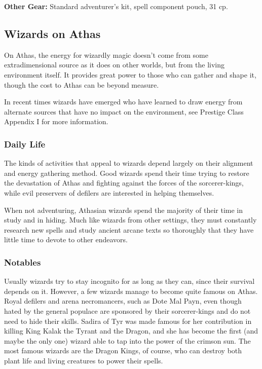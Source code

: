 \textbf{Other Gear:} Standard adventurer's kit, spell component pouch, 31 cp.


\subsection{Wizards on Athas}

On Athas, the energy for wizardly magic doesn't come from some extradimensional source as it does on other worlds, but from the living environment itself. It provides great power to those who can gather and shape it, though the cost to Athas can be beyond measure.

In recent times wizards have emerged who have learned to draw energy from alternate sources that have no impact on the environment, see Prestige Class Appendix I for more information.

\subsubsection{Daily Life}
The kinds of activities that appeal to wizards depend largely on their alignment and energy gathering method. Good wizards spend their time trying to restore the devastation of Athas and fighting against the forces of the sorcerer-kings, while evil preservers of defilers are interested in helping themselves.

When not adventuring, Athasian wizards spend the majority of their time in study and in hiding. Much like wizards from other settings, they must constantly research new spells and study ancient arcane texts so thoroughly that they have little time to devote to other endeavors.

\subsubsection{Notables}
Usually wizards try to stay incognito for as long as they can, since their survival depends on it. However, a few wizards manage to become quite famous on Athas. Royal defilers and arena necromancers, such as Dote Mal Payn, even though hated by the general populace are sponsored by their sorcerer-kings and do not need to hide their skills. Sadira of Tyr was made famous for her contribution in killing King Kalak the Tyrant and the Dragon, and she has become the first (and maybe the only one) wizard able to tap into the power of the crimson sun. The most famous wizards are the Dragon Kings, of course, who can destroy both plant life and living creatures to power their spells.

